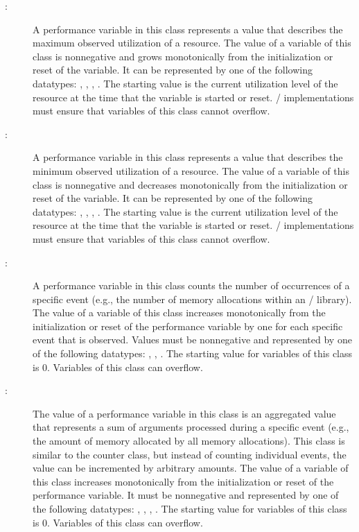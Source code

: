 \begin{sloppy}
\begin{description}
\item[:]A performance variable
  in this class represents a value that describes the maximum observed
  utilization of a resource.  The value of a variable of this class is
  nonnegative and grows monotonically from the initialization or reset of
  the variable.  It can be represented by one of the following datatypes:
  , ,
  , .  The starting
  value is the current utilization level of the resource at the time that
  the variable is started or reset.  \MPI/ implementations must ensure that
  variables of this class cannot overflow.

\item[:]A performance variable in
  this class represents a value that describes the minimum observed
  utilization of a resource.  The value of a variable of this class is
  nonnegative and decreases monotonically from the initialization or reset
  of the variable.  It can be represented by one of the following
  datatypes: , ,
  , .  The starting
  value is the current utilization level of the resource at the time that
  the variable is started or reset.  \MPI/ implementations must ensure that
  variables of this class cannot overflow.

\item[:]A performance variable in this
  class counts the number of occurrences of a specific event (e.g., the
  number of memory allocations within an \MPI/ library).  The value of a
  variable of this class increases monotonically from the initialization or
  reset of the performance variable by one for each specific event that is
  observed.  Values must be nonnegative and represented by one of the
  following datatypes: , ,
  .  The starting value for variables of
  this class is 0.  Variables of this class can overflow.

\item[:]The value of a performance
  variable in this class is an aggregated value that represents a sum of
  arguments processed during a specific event (e.g., the amount of memory
  allocated by all memory allocations).  This class is similar to the
  counter class, but instead of counting individual events, the value can
  be incremented by arbitrary amounts.  The value of a variable of this
  class increases monotonically from the initialization or reset of the
  performance variable.  It must be nonnegative and represented by one of
  the following datatypes: ,
  , ,
  .  The starting value for variables of this class is
  0.  Variables of this class can overflow.


\end{description}
\end{sloppy}
